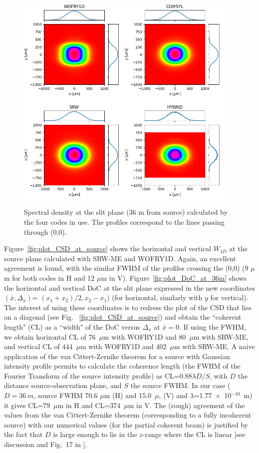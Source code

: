 \documentclass{iucr}              %
\begin{document}
\begin{figure}
    \label{fig:plot_2D_spectral_density_36m}
    \includegraphics[width=0.95\textwidth]{figures/plot_2D_spectral_density_36m.png}
    \caption{Spectral density at the slit plane (36 m from source) calculated by the four codes in use. The profiles correspond to the lines passing through (0,0).
    }
\end{figure}


Figure~\ref{fig:plot_CSD_at_source} shows the horizontal and vertical $W_{1D}$ at the source plane calculated with SRW-ME and WOFRY1D. Again, an excellent agreement is found, with the similar FWHM of the profiles crossing the (0,0) (9 $\mu$m for both codes in H and 12 $\mu$m in V).
Figure~\ref{fig:plot_DoC_at_36m} shows the horizontal and vertical DoC at the slit plane expressed in the new coordinates $(\bar{x},\Delta_x)$= $(x_1+x_2)/2, x_2-x_1)$ (for horizontal, similarly with $y$ for vertical). The interest of using these coordinates is to redress the plot of the CSD that lies on a diagonal (see Fig. ~\ref{fig:plot_CSD_at_source}) and obtain the ``coherent length" (CL) as a ``width" of the DoC versus $\Delta_x$ at $\bar{x}=0$. If using the FWHM, we obtain horizontal CL of 76~$\mu$m with WOFRY1D and 80~$\mu$m with SRW-ME, and vertical CL of
444~$\mu$m with WOFRY1D and 402~$\mu$m with SRW-ME. A naive application of the van Cittert-Zernike theorem for a source with Gaussian intensity profile permits to calculate the coherence length (the FWHM of the Fourier Transform of the source intensity profile) as CL=0.88$\lambda D/S$, with $D$ the distance source-observation plane, and $S$ the source FWHM. In our case ($D=36~m$, source FWHM 70.6 $\mu$m (H) and 15.0~$\mu$, (V) and $\lambda$=1.77~$\times$~10$^{-10}$~m) it gives CL=79~$\mu$m in H and CL=374~$\mu$m in V. The (rough) agreement of the values from the van Cittert-Zernike theorem (corresponding to a fully incoherent source) with our numerical values (for the partial coherent beam) is justified by the fact that $D$ is large enough to lie in the $z$-range where the CL is linear [see discussion and Fig.~17 in \cite{geloni2008}].
\end{document}
